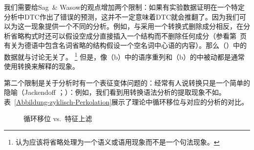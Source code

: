 我们需要给Sag~\& Wasow的观点增加两个限制：如果有实验数据证明在一个特定分析中DTC作出了错误的预测，这并不一定意味着DTC就会推翻了。因为我们可以为这一现象提供一个不同的分析。例如，与采用一个转换式删除成分相反，在分析省略构式时还可以假设空成分直接插入一个结构而不删除任何成分（参看第~\pageref{np-epsilon}页有关为德语中包含名词省略的结构假设一个空名词中心语的内容）。那么（）中的数据就与讨论无关了。 
\footnote{%
 \citet[\S~1, \S~7]{CJ2005a}认为应该将省略处理为一个语义或语用现象而不是一个句法现象。 
} 但是，像（b）中的语序重列和（b）的中被动都是通常使用转换来解释的现象。

第二个限制是关于分析时有一个表征变体问题的：经常有人说转换只是一个简单的隐喻（Jackendoff \citeyear[--23]{Jackendoff2000a}；\citeyear[, 20]{Jackendoff2007a}）：例如，我们看到用转换语法分析的提取现象不如\hpsgc。表~\vref{Abbildung-zyklisch-Perkolation}展示了\gbc 理论中循环移位与对应的\hpsgc 分析的对比。
\begin{figure}
\hfill%
\hfill
{}
\hfill\mbox{}%
\caption{循环移位 vs.\ 特征上滤}\label{Abbildung-zyklisch-Perkolation}
\end{figure}%

